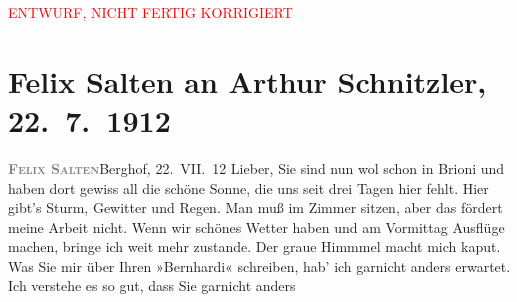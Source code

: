 
\begin{center}
            \textcolor{red}{ENTWURF, NICHT FERTIG KORRIGIERT}
                      \end{center}
            
         
         \renewcommand{\erwaehntePersonen}{Personen: Samuel Fischer, Hedwig Fischer, Karl Goldmark, Olga Schnitzler, Heinrich Schnitzler, Lili Schnitzler}
         \renewcommand{\erwaehnteOrte}{Orte: Berghof, Brijuni, Unterach am Attersee}
         \renewcommand{\erwaehnteWerke}{Werke: Professor Bernhardi. Komödie in fünf Akten}
               \section[Felix Salten an Arthur Schnitzler, 22. 7. 1912]{ Felix Salten an Arthur Schnitzler, 22. 7. 1912}\nopagebreak{}\rehead{ }\begin{ledgroupsized}[t]{13cm}\normalsize\beginnumbering \toendnotes[C]{\smallbreak\pagebreak[2]} 
\toendnotes[C]{\smallbreak}\pstart
           \noindent{}{\pb}\textcolor{gray}{\textbf{\textsc{Felix Salten}}}\hfill Berghof, 22. VII. 12\pend
           \pstart{}Lieber,\pend\pstart
           Sie sind nun wol schon in Brioni und haben dort gewiss
               all die schöne Sonne, die uns seit drei Tagen hier fehlt. Hier gibt’s Sturm, Gewitter
               und Regen. Man muß im Zimmer sitzen, aber das fördert meine Arbeit nicht. Wenn wir
               schönes Wetter haben und am Vormittag Ausflüge machen, bringe ich weit mehr zustande.
               Der graue Himmmel macht mich kaput.\pend
           \pstart
           Was Sie mir über Ihren »Bernhardi« schreiben,
               hab’ ich garnicht anders erwartet. Ich verstehe es so gut, dass Sie garnicht anders

\end{ledgroupsized}
